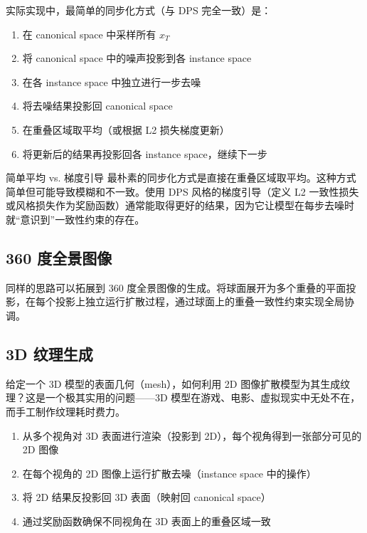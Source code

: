 实际实现中，最简单的同步化方式（与 DPS 完全一致）是：

\begin{enumerate}
    \item 在 canonical space 中采样所有 $x_T$
    \item 将 canonical space 中的噪声投影到各 instance space
    \item 在各 instance space 中独立进行一步去噪
    \item 将去噪结果投影回 canonical space
    \item 在重叠区域取平均（或根据 L2 损失梯度更新）
    \item 将更新后的结果再投影回各 instance space，继续下一步
\end{enumerate}

\begin{warningbox}{简单平均 vs. 梯度引导}
最朴素的同步化方式是直接在重叠区域取平均。这种方式简单但可能导致模糊和不一致。使用 DPS 风格的梯度引导（定义 L2 一致性损失或风格损失作为奖励函数）通常能取得更好的结果，因为它让模型在每步去噪时就``意识到''一致性约束的存在。
\end{warningbox}

\subsection{360 度全景图像}

同样的思路可以拓展到 360 度全景图像的生成。将球面展开为多个重叠的平面投影，在每个投影上独立运行扩散过程，通过球面上的重叠一致性约束实现全局协调。

\subsection{3D 纹理生成}

给定一个 3D 模型的表面几何（mesh），如何利用 2D 图像扩散模型为其生成纹理？这是一个极其实用的问题——3D 模型在游戏、电影、虚拟现实中无处不在，而手工制作纹理耗时费力。

\begin{enumerate}
    \item 从多个视角对 3D 表面进行渲染（投影到 2D），每个视角得到一张部分可见的 2D 图像
    \item 在每个视角的 2D 图像上运行扩散去噪（instance space 中的操作）
    \item 将 2D 结果反投影回 3D 表面（映射回 canonical space）
    \item 通过奖励函数确保不同视角在 3D 表面上的重叠区域一致
\end{enumerate}


